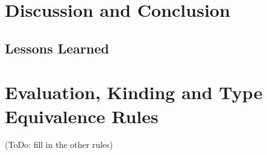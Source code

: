 \documentclass[preprint]{sigplanconf}
\begin{document}
\section{\label{section-discussion}Discussion and Conclusion}

\subsection{Lessons Learned}

\appendix

\section{\label{append1}Evaluation, Kinding and Type Equivalence Rules}

(ToDo: fill in the other rules)











\end{document}
